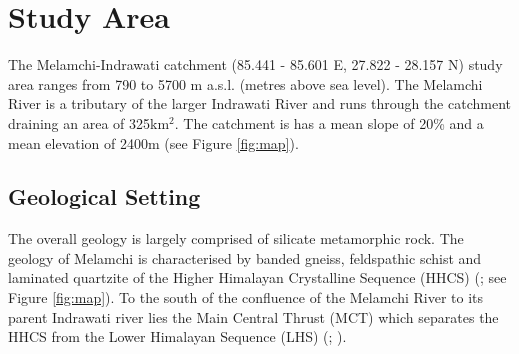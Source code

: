 
\section{Study Area}



The Melamchi-Indrawati catchment (85.441 - 85.601 E, 27.822 - 28.157 N) study area ranges from 790 to 5700 m a.s.l. (metres above sea level). The Melamchi River is a tributary of the larger Indrawati River and runs through the catchment draining an area of 325km${^2}$. The catchment is has a mean slope of 20\% and a mean elevation of 2400m (see Figure \ref{fig:map}). 

\subsection{Geological Setting}


The overall geology is largely comprised of silicate metamorphic rock. The geology of Melamchi is characterised by banded gneiss, feldspathic schist and laminated quartzite of the Higher Himalayan Crystalline Sequence (HHCS) (\textcite{dhitalGeologyNepalHimalaya2015}; see Figure \ref{fig:map}). To the south of the confluence of the Melamchi River to its parent Indrawati river lies the Main Central Thrust (MCT) which separates the HHCS from the Lower Himalayan Sequence (LHS) (\cite{dhitalGeologyNepalHimalaya2015}; \cite{grafGeomorphologicalHydrologicalControls2023}).


    


